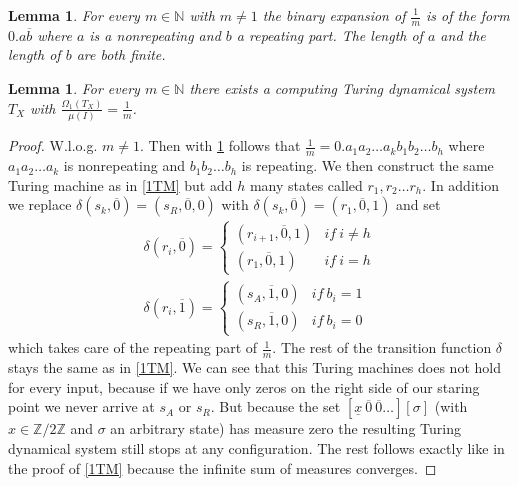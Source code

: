 \documentclass[12pt,a4paper]{scrartcl}
\newtheorem{Lemma}[Theorem]{Lemma}
\numberwithin{equation}{section}
\newcommand{\N}{\mathbb{N}} %
\newcommand{\2}{\mathbb{Z} / 2 \mathbb{Z}}
\newcommand{\1}{\overline{1}}
\newcommand{\0}{\overline{0}}
\begin{document}
\begin{Lemma} \label{frac}
	For every $m \in \N$ with $m \neq 1$ the binary expansion of $\frac{1}{m}$ is of the form $0. a \overline{b}$ where $a$ is a nonrepeating and $b$ a repeating part. The length of $a$ and the length of $b$ are both finite.
\end{Lemma}
\begin{Lemma} \label{2TM}
	For every $m \in \N$ there exists a computing Turing dynamical system $T_X$ with $\frac{\Omega_1(T_X)}{\mu(I)} = \frac{1}{m}$.
\end{Lemma}
\begin{proof}
	W.l.o.g. $m \neq 1$. Then with \ref{frac} follows that $\frac{1}{m} = 0.a_1a_2 \ldots a_k b_1 b_2 \ldots b_h$ where $a_1a_2 \ldots a_k$ is nonrepeating and $b_1 b_2 \ldots b_h$ is repeating. We then construct the same Turing machine as in \ref{1TM} but add $h$ many states called $r_1, r_2 \ldots r_h$. In addition we replace $\delta(s_k, \0) = (s_R, \0, 0)$ with $\delta(s_k, \0) = (r_1, \0, 1)$ and set
	\begin{align*}
		\delta(r_i, \overline{0}) = \begin{cases}
			(r_{i+1}, \overline{0}, 1) & if \ i \neq h \\
			(r_1, \overline{0}, 1) & if \ i = h
		\end{cases} \\
		\delta(r_i, \overline{1}) = \begin{cases}
			(s_A, \overline{1}, 0) & if \ b_i = 1 \\
			(s_R, \overline{1}, 0) & if \ b_i = 0
		\end{cases}
	\end{align*}
	which takes care of the repeating part of $\frac{1}{m}$. The rest of the transition function $\delta$ stays the same as in \ref{1TM}. We can see that this Turing machines does not hold for every input, because if we have only zeros on the right side of our staring point we never arrive at $s_A$ or $s_R$. But because the set $[\underline{x} \ \0 \ \0 \ldots][\sigma]$ (with $x \in \2$ and $\sigma$ an arbitrary state) has measure zero the resulting Turing dynamical system still stops at any configuration. The rest follows exactly like in the proof of \ref{1TM} because the infinite sum of measures converges.
\end{proof}
\end{document}
